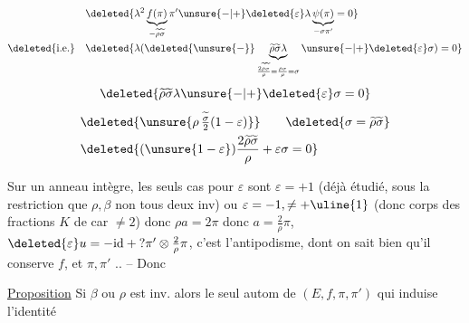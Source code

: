 \[
\begin{aligned}
&\deleted{\lambda^2\underbrace{f(\pi)}_{-\widetilde\rho\widetilde\sigma}\pi'\unsure{-|+}\deleted{\varepsilon}\lambda\underbrace{\psi(\pi)}_{-\sigma\pi'}=0}\\
\deleted{\text{i.e.}}\quad&\deleted{\lambda(\deleted{\unsure{-}}\underbrace{\widetilde\rho\widetilde\sigma\lambda}_{\frac{2\widetilde\rho\widetilde\sigma}{\rho}=\frac{\rho\sigma}{\rho}=\sigma}\unsure{-|+}\deleted{\varepsilon}\sigma)=0}
\end{aligned}
\]
\[
\deleted{\widetilde\rho\widetilde\sigma\lambda\unsure{-|+}\deleted{\varepsilon}\sigma=0}
\]
\[
\begin{aligned}
&\deleted{\unsure{\rho\,\tfrac{\widetilde\sigma}{2}(1-\varepsilon)}}\qquad\deleted{\sigma=\widetilde\rho\widetilde\sigma}\\
&\deleted{(\unsure{1-\varepsilon})\frac{2\widetilde\rho\widetilde\sigma}{\rho}+\varepsilon\sigma=0}
\end{aligned}
\]

Sur un anneau intègre, les seuls cas pour $\varepsilon$ sont $\varepsilon=+1$ (déjà étudié, sous la restriction que $\rho,\beta$ non tous deux inv) ou $\varepsilon=-1,\ne+\uline{1}$ (donc  corps des fractions $K$ de car $\ne2$) donc $\rho a=2\pi$ donc $a=\frac2\rho\pi$, $\deleted{\varepsilon}u=-\mathrm{id}+\mathord{?}\pi'\otimes\frac2\rho\pi$, c'est l'antipodisme,  dont on sait bien qu'il conserve $f$, et  $\pi,\pi'$ .. -- Donc

\uline{Proposition}   Si $\beta$ ou $\rho$ est inv.  alors le seul autom de $(E,f,\pi,\pi')$ qui induise l'identité

